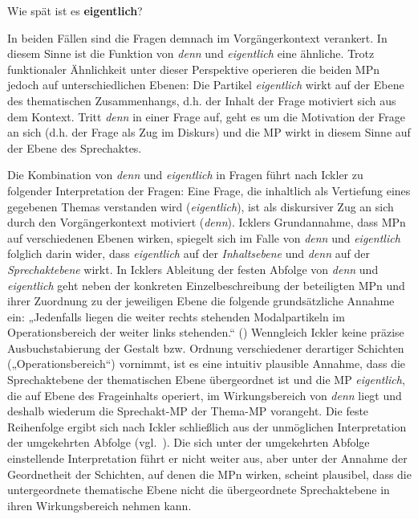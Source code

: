 \begin{exe}
	\ex\label{155} 
	Wie spät ist es \textbf{eigentlich}?
\end{exe}
In beiden Fällen sind die Fragen demnach im Vorgängerkontext verankert. In diesem Sinne ist die Funktion von \textit{denn} und \textit{eigentlich} eine ähnliche. Trotz funktionaler Ähnlichkeit unter dieser Perspektive operieren die beiden MPn jedoch auf unterschiedlichen Ebenen: Die Partikel \textit{eigentlich} wirkt auf der Ebene des thematischen Zusammenhangs, d.h. der Inhalt der Frage motiviert sich aus dem Kontext. Tritt \textit{denn} in einer Frage auf, geht es um die Motivation der Frage an sich (d.h. der Frage als Zug im Diskurs) und die MP wirkt in diesem Sinne auf der Ebene des Sprechaktes. 

Die Kombination von \textit{denn} und \textit{eigentlich} in Fragen führt nach Ickler zu folgender Interpretation der Fragen: Eine Frage, die inhaltlich als Vertiefung eines gegebenen Themas verstanden wird (\textit{eigentlich}), ist als diskursiver Zug an sich durch den Vorgängerkontext motiviert (\textit{denn}). Icklers Grundannahme, dass MPn auf verschiedenen Ebenen wirken, spiegelt sich im Falle von \textit{denn} und \textit{eigentlich} folglich darin wider, dass \textit{eigentlich} auf der \textit{Inhaltsebene} und \textit{denn} auf der \textit{Sprech\-aktebene} wirkt. In Icklers Ableitung der festen Abfolge von \textit{denn} und \textit{eigentlich} geht neben der konkreten Einzelbeschreibung der beteiligten MPn und ihrer Zuordnung zu der jeweiligen Ebene die folgende grundsätzliche Annahme ein: „Jedenfalls liegen die weiter rechts stehenden Modalpartikeln im Operationsbereich der weiter links stehenden.“ (\citealt[379]{Ickler1994}) Wenngleich Ickler keine präzise Ausbuchstabierung der Gestalt bzw. Ordnung verschiedener derartiger Schichten („Operationsbereich“) vornimmt, ist es eine intuitiv plausible Annahme, dass die Sprechaktebene der thematischen Ebene übergeordnet ist und die MP \textit{eigentlich}, die auf Ebene des Frageinhalts operiert, im Wirkungsbereich von \textit{denn} liegt und deshalb wiederum die Sprechakt-MP der Thema-MP vorangeht. Die feste Reihenfolge ergibt sich nach Ickler schließlich aus der unmöglichen Interpretation der umgekehrten Abfolge (vgl.\ \citealt[384]{Ickler1994}). Die sich unter der umgekehrten Abfolge einstellende Interpretation führt er nicht weiter aus, aber unter der Annahme der Geordnetheit der Schichten, auf denen die MPn wirken, scheint plausibel, dass die untergeordnete themati\-sche Ebene nicht die übergeordnete Sprechaktebene in ihren Wirkungsbereich nehmen kann. 


